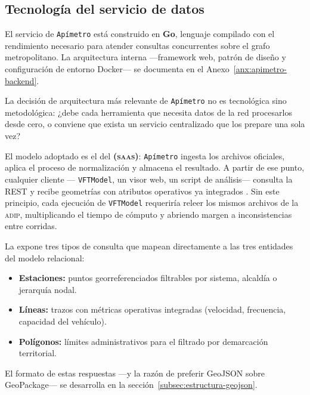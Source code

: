
\subsection{Tecnología del servicio de datos}
\label{subsec:backend}

El servicio de \texttt{Apímetro} está construido en \textbf{Go}, lenguaje
compilado con el rendimiento necesario para atender consultas concurrentes sobre
el grafo metropolitano. La arquitectura interna —framework web, patrón de diseño
y configuración de entorno Docker— se documenta en el
Anexo~\ref{anx:apimetro-backend}.

\label{subsubsec:estructuraEndpoints}

La decisión de arquitectura más relevante de \texttt{Apímetro} no es tecnológica
sino metodológica: ¿debe cada herramienta que necesita datos de la red
procesarlos desde cero, o conviene que exista un servicio centralizado que los
prepare una sola vez?

El modelo adoptado es el del
\textbf{ (\textsc{saas})}: \texttt{Apímetro}
ingesta los archivos \gtfs{} oficiales, aplica el proceso de normalización y
almacena el resultado. A partir de ese punto, cualquier cliente —
\texttt{VFTModel}, un visor web, un script de análisis— consulta la \api{} REST
y recibe geometrías con atributos operativos ya integrados
\citep{cabrera2026VFTModel}. Sin este principio, cada ejecución de
\texttt{VFTModel} requeriría releer los mismos archivos de la \textsc{adip},
multiplicando el tiempo de cómputo y abriendo margen a inconsistencias entre
corridas.

La \api{} expone tres tipos de consulta que mapean directamente a las tres
entidades del modelo relacional:

\begin{itemize}
    \item \textbf{Estaciones:} puntos georreferenciados filtrables por
    sistema, alcaldía o jerarquía nodal.
    \item \textbf{Líneas:} trazos con métricas operativas integradas
    (velocidad, frecuencia, capacidad del vehículo).
    \item \textbf{Polígonos:} límites administrativos para el filtrado por
    demarcación territorial.
\end{itemize}

El formato de estas respuestas —y la razón de preferir GeoJSON sobre GeoPackage—
se desarrolla en la sección~\ref{subsec:estructura-geojson}.
